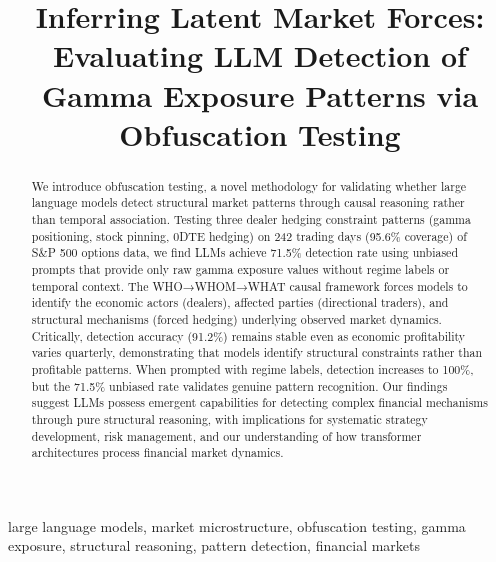 \documentclass[conference]{IEEEtran}
\begin{document}
\title{Inferring Latent Market Forces: Evaluating LLM Detection of Gamma Exposure Patterns via Obfuscation Testing}

\author{
\and
{}
}

\maketitle

\begin{abstract}
We introduce obfuscation testing, a novel methodology for validating whether large language models detect structural market patterns through causal reasoning rather than temporal association. Testing three dealer hedging constraint patterns (gamma positioning, stock pinning, 0DTE hedging) on 242 trading days (95.6\% coverage)  of S\&P 500 options data, we find LLMs achieve 71.5\% detection rate using unbiased prompts that provide only raw gamma exposure values without regime labels or temporal context. The WHO→WHOM→WHAT causal framework forces models to identify the economic actors (dealers), affected parties (directional traders), and structural mechanisms (forced hedging) underlying observed market dynamics. Critically, detection accuracy (91.2\%) remains stable even as economic profitability varies quarterly, demonstrating that models identify structural constraints rather than profitable patterns. When prompted with regime labels, detection increases to 100\%, but the 71.5\% unbiased rate validates genuine pattern recognition. Our findings suggest LLMs possess emergent capabilities for detecting complex financial mechanisms through pure structural reasoning, with implications for systematic strategy development, risk management, and our understanding of how transformer architectures process financial market dynamics.
\end{abstract}

\begin{IEEEkeywords}
large language models, market microstructure, obfuscation testing, gamma exposure, structural reasoning, pattern detection, financial markets
\end{IEEEkeywords}
\end{document}
